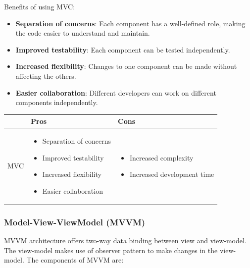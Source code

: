 Benefits of using MVC:

\begin{itemize}
    \item \textbf{Separation of concerns}: Each component has a well-defined role, making the code easier to understand and maintain.
    \item \textbf{Improved testability}: Each component can be tested independently.
    \item \textbf{Increased flexibility}: Changes to one component can be made without affecting the others.
    \item \textbf{Easier collaboration}: Different developers can work on different components independently.
\end{itemize}

\begin{table}[htbp]
    \centering
    \begin{tabularx}{\textwidth}{| X | X | X |}
        \hline
                &       Pros        &       Cons        \\ \hline
        MVC     &   \begin{itemize}
                        \item Separation of concerns
                        \item Improved testability
                        \item Increased flexibility
                        \item Easier collaboration
                    \end{itemize}
                &   \begin{itemize}
                        \item Increased complexity
                        \item Increased development time
                    \end{itemize} \\ \hline
    \end{tabularx}
\end{table}

\subsubsection{Model-View-ViewModel (MVVM)}

MVVM architecture offers two-way data binding between view and view-model. The view-model makes use of observer pattern to make changes in the view-model. The components of MVVM are:

